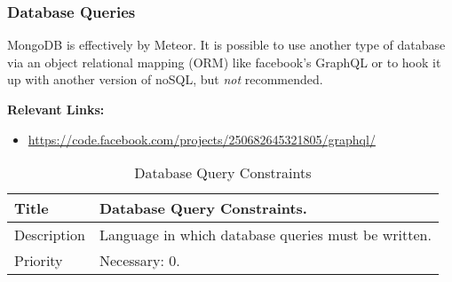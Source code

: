 \subsubsection{Database Queries}
  MongoDB is effectively by Meteor. It is possible to use another type of
  database via an object relational mapping (ORM) like facebook's GraphQL or to
  hook it up with another version of noSQL, but \textit{not} recommended.

  \textbf{Relevant Links:}
  \begin{itemize}
    \item \url{https://code.facebook.com/projects/250682645321805/graphql/}
  \end{itemize}

  \begin{table}[h!]
    \caption{Database Query Constraints}
    \label{system-constraints/langauge/database-table}
    \begin{tabularx}{\textwidth}{|l|X|}
      \hline
      Title       & Database Query Constraints. \\ \hline
      Description & Language in which database queries must be written. \\\hline
      Priority    & Necessary: 0. \\ \hline
    \end{tabularx}
  \end{table}
